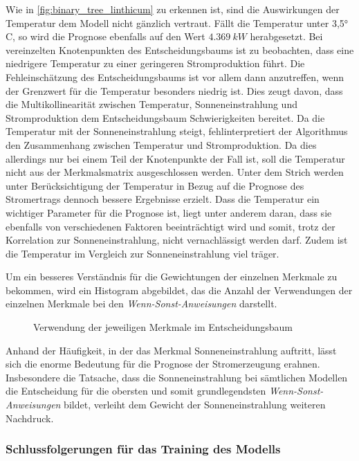 \documentclass[12pt, a4paper]{article}
\begin{document}
Wie in \autoref{fig:binary_tree_linthicum} zu erkennen ist, sind die Auswirkungen der Temperatur dem Modell nicht gänzlich vertraut. Fällt die Temperatur unter 3,5° C, so wird die Prognose ebenfalls auf den Wert $4.369\ kW$ herabgesetzt. Bei vereinzelten Knotenpunkten des Entscheidungsbaums ist zu beobachten, dass eine niedrigere Temperatur zu einer geringeren Stromproduktion führt. Die Fehleinschätzung des Entscheidungsbaums ist vor allem dann anzutreffen, wenn der Grenzwert für die Temperatur besonders niedrig ist. Dies zeugt davon, dass die Multikollinearität zwischen Temperatur, Sonneneinstrahlung und Stromproduktion dem Entscheidungsbaum Schwierigkeiten bereitet. Da die Temperatur mit der Sonneneinstrahlung steigt, fehlinterpretiert der Algorithmus den Zusammenhang zwischen Temperatur und Stromproduktion. Da dies allerdings nur bei einem Teil der Knotenpunkte der Fall ist, soll die Temperatur nicht aus der Merkmalsmatrix ausgeschlossen werden. Unter dem Strich werden unter Berücksichtigung der Temperatur in Bezug auf die Prognose des Stromertrags dennoch bessere Ergebnisse erzielt. Dass die Temperatur ein wichtiger Parameter für die Prognose ist, liegt unter anderem daran, dass sie ebenfalls von verschiedenen Faktoren beeinträchtigt wird und somit, trotz der Korrelation zur Sonneneinstrahlung, nicht vernachlässigt werden darf. Zudem ist die Temperatur im Vergleich zur Sonneneinstrahlung viel träger.

Um ein besseres Verständnis für die Gewichtungen der einzelnen Merkmale zu bekommen, wird ein Histogram abgebildet, das die Anzahl der Verwendungen der einzelnen Merkmale bei den \textit{Wenn-Sonst-Anweisungen} darstellt.

\begin{figure}[H]
\centering
\fontsize{20}{20}\selectfont
\def\svgwidth{400pt}

\caption{Verwendung der jeweiligen Merkmale im Entscheidungsbaum}
\label{fig:histogram_feature_quantity}
\end{figure}

Anhand der Häufigkeit, in der das Merkmal Sonneneinstrahlung auftritt, lässt sich die enorme Bedeutung für die Prognose der Stromerzeugung erahnen. Insbesondere die Tatsache, dass die Sonneneinstrahlung bei sämtlichen Modellen die Entscheidung für die obersten und somit grundlegendsten \textit{Wenn-Sonst-Anweisungen} bildet, verleiht dem Gewicht der Sonneneinstrahlung weiteren Nachdruck.



\subsubsection{Schlussfolgerungen für das Training des Modells}
\label{subsubsec:conclusion_for_training}
\end{document}
